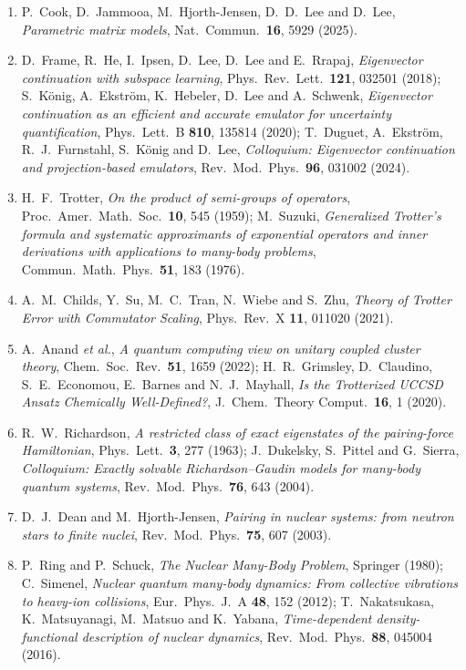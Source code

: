 \documentclass[12pt,a4paper]{article}
\begin{document}
\begin{enumerate}
    \item P.~Cook, D.~Jammooa, M.~Hjorth-Jensen, D.~D.~Lee and D.~Lee, \textit{Parametric matrix models}, Nat.\ Commun.\ \textbf{16}, 5929 (2025).
    \item D.~Frame, R.~He, I.~Ipsen, D.~Lee, D.~Lee and E.~Rrapaj, \textit{Eigenvector continuation with subspace learning}, Phys.\ Rev.\ Lett.\ \textbf{121}, 032501 (2018); S.~K\"onig, A.~Ekstr\"om, K.~Hebeler, D.~Lee and A.~Schwenk, \textit{Eigenvector continuation as an efficient and accurate emulator for uncertainty quantification}, Phys.\ Lett.\ B \textbf{810}, 135814 (2020); T.~Duguet, A.~Ekstr\"om, R.~J.~Furnstahl, S.~K\"onig and D.~Lee, \textit{Colloquium: Eigenvector continuation and projection-based emulators}, Rev.\ Mod.\ Phys.\ \textbf{96}, 031002 (2024).
    \item H.~F.~Trotter, \textit{On the product of semi-groups of operators}, Proc.\ Amer.\ Math.\ Soc.\ \textbf{10}, 545 (1959); M.~Suzuki, \textit{Generalized Trotter's formula and systematic approximants of exponential operators and inner derivations with applications to many-body problems}, Commun.\ Math.\ Phys.\ \textbf{51}, 183 (1976).
    \item A.~M.~Childs, Y.~Su, M.~C.~Tran, N.~Wiebe and S.~Zhu, \textit{Theory of Trotter Error with Commutator Scaling}, Phys.\ Rev.\ X \textbf{11}, 011020 (2021).
    \item A.~Anand \textit{et al.}, \textit{A quantum computing view on unitary coupled cluster theory}, Chem.\ Soc.\ Rev.\ \textbf{51}, 1659 (2022); H.~R.~Grimsley, D.~Claudino, S.~E.~Economou, E.~Barnes and N.~J.~Mayhall, \textit{Is the Trotterized UCCSD Ansatz Chemically Well-Defined?}, J.\ Chem.\ Theory Comput.\ \textbf{16}, 1 (2020).
    \item R.~W.~Richardson, \textit{A restricted class of exact eigenstates of the pairing-force Hamiltonian}, Phys.\ Lett.\ \textbf{3}, 277 (1963); J.~Dukelsky, S.~Pittel and G.~Sierra, \textit{Colloquium: Exactly solvable Richardson--Gaudin models for many-body quantum systems}, Rev.\ Mod.\ Phys.\ \textbf{76}, 643 (2004).
    \item D.~J.~Dean and M.~Hjorth-Jensen, \textit{Pairing in nuclear systems: from neutron stars to finite nuclei}, Rev.\ Mod.\ Phys.\ \textbf{75}, 607 (2003).
    \item P.~Ring and P.~Schuck, \textit{The Nuclear Many-Body Problem}, Springer (1980); C.~Simenel, \textit{Nuclear quantum many-body dynamics: From collective vibrations to heavy-ion collisions}, Eur.\ Phys.\ J.\ A \textbf{48}, 152 (2012); T.~Nakatsukasa, K.~Matsuyanagi, M.~Matsuo and K.~Yabana, \textit{Time-dependent density-functional description of nuclear dynamics}, Rev.\ Mod.\ Phys.\ \textbf{88}, 045004 (2016).

\end{enumerate}
\end{document}
